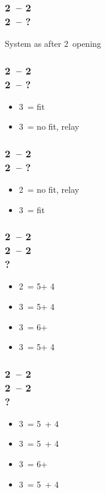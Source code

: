 \subsubsection*{2\clubs\ -- 2\diams \\ 2\nt\ -- ?}
System as after 2\nt\ opening

\subsubsection*{2\clubs\ -- 2\diams \\ 2\hearts\ -- ?}
\begin{itemize}
    \item 3\hearts\ = fit
    \item 3\spades\ = no fit, relay
\end{itemize}

\subsubsection*{2\clubs\ -- 2\diams \\ 2\spades\ -- ?}
\begin{itemize}
    \item 2\nt\ = no fit, relay
    \item 3\spades\ = fit
\end{itemize}

\subsubsection*{2\clubs\ -- 2\diams \\ 
                2\hearts\ -- 2\spades \\
                ?}
\begin{itemize}
    \item 2\nt\ = 5\hearts + 4\clubs
    \item 3\clubs\ = 5\hearts + 4\diams
    \item 3\diams\ = 6+\hearts
    \item 3\hearts\ = 5\hearts + 4\spades
\end{itemize}

\subsubsection*{2\clubs\ -- 2\diams \\ 
                2\spades\ -- 2\ntx \\
                ?}
\begin{itemize}
    \item 3\clubs\ = 5\spades\ + 4\diams
    \item 3\diams\ = 5\spades\ + 4\hearts
    \item 3\hearts\ = 6+\spades
    \item 3\spades\ = 5\spades\ + 4\clubs
\end{itemize}

